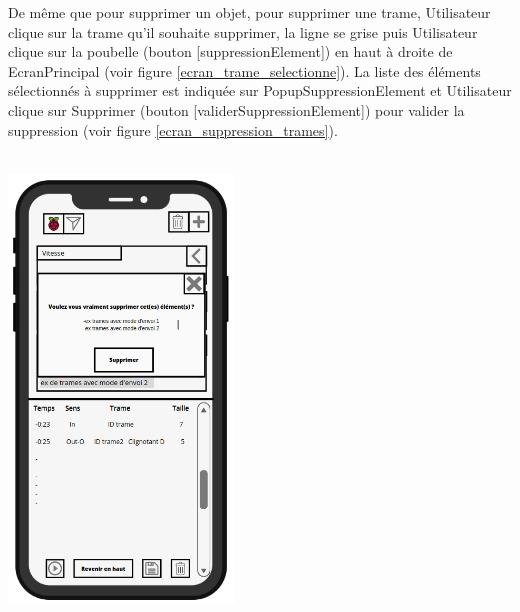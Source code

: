 \newpage
De même que pour supprimer un objet, pour supprimer une trame, Utilisateur clique sur la trame qu'il souhaite supprimer, la ligne se grise puis Utilisateur clique sur la poubelle (bouton [suppressionElement]) en haut à droite de EcranPrincipal (voir figure \ref{ecran_trame_selectionne}). La liste des éléments sélectionnés à supprimer est indiquée sur PopupSuppressionElement et Utilisateur clique sur {\guillemetleft} Supprimer {\guillemetright} (bouton [validerSuppressionElement]) pour valider la suppression (voir figure \ref{ecran_suppression_trames}).
\\\\
\begin{minipage}{1\linewidth}
    \centering
    \includegraphics[width=0.45\textwidth]{sections/3_Exigences_specifiques/1_IHM/ihm/ecranSuppressionElementTrame.png}
    \captionsetup{justification=centering}
    \label{ecran_suppression_trames}
\end{minipage} \newline
\vspace{1cm}

\newpage
